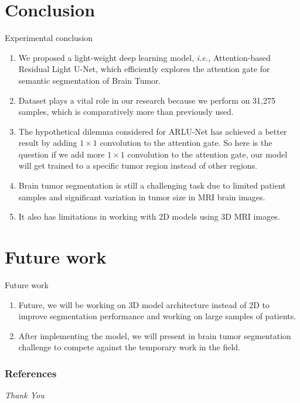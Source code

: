 \documentclass [xcolor=svgnames, t] {beamer}
\begin{document}
\section{Conclusion}
\begin{frame}{Experimental conclusion}
\vspace*{\fill}
    \begin{enumerate}
    \justifying
        \item We proposed a light-weight deep learning model, \emph{i.e.,} Attention-based Residual Light U-Net, which efficiently explores the attention gate for semantic segmentation of Brain Tumor.
        \item Dataset plays a vital role in our research because we perform on 31,275 samples, which is comparatively more than previously used.
        \item The hypothetical dilemma considered for ARLU-Net has achieved a better result by adding $1 \times 1$ convolution to the attention gate. So here is the question if we add more $1 \times 1$ convolution to the attention gate, our model will get trained to a specific tumor region instead of other regions.
        \item Brain tumor segmentation is still a challenging task due to limited patient samples and significant variation in tumor size in MRI brain images. 
        \item It also has limitations in working with 2D models using 3D MRI images.
    \end{enumerate}
    \vspace*{\fill}
\end{frame}

\section{Future work}
\begin{frame}{Future work}
\vspace*{\fill}
\begin{enumerate}
    \item Future, we will be working on 3D model architecture instead of 2D to improve segmentation performance and working on large samples of patients.
    \item After implementing the model, we will present in brain tumor segmentation challenge to compete against the temporary work in the field.
\end{enumerate}
\vspace*{\fill}
\end{frame}
    
\begin{frame} [allowframebreaks]\frametitle{References}
    \tiny
    
    \nocite{*}
\end{frame}


\begin{frame}[standout]
\vspace{35mm}
\centering \Huge
  \emph{Thank You}
\end{frame}
\end{document}
